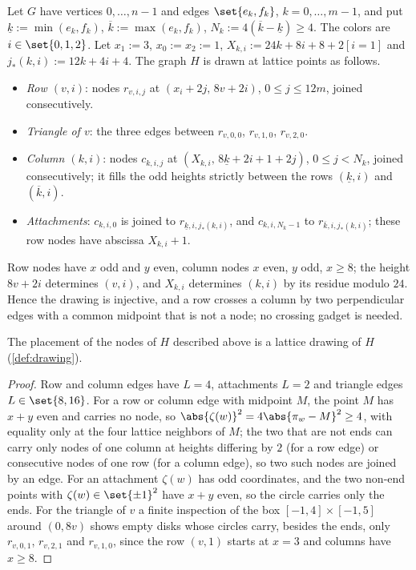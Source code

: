 Let $G$ have vertices $0,\dots,n-1$ and edges $\set{e_k,f_k}$, $k=0,\dots,m-1$, and put $\underline k:=\min(e_k,f_k)$, $\overline k:=\max(e_k,f_k)$, $N_k:=4(\overline k-\underline k)\ge4$. The colors are $i\in\set{0,1,2}$. Let $x_1:=3$, $x_0:=x_2:=1$, $X_{k,i}:=24k+8i+8+2[i=1]$ and $j_*(k,i):=12k+4i+4$. The graph $H$ is drawn at lattice points as follows.
\begin{itemize}
\item \emph{Row $(v,i)$}: nodes $r_{v,i,j}$ at $(x_i+2j,\,8v+2i)$, $0\le j\le12m$, joined consecutively.
\item \emph{Triangle of $v$}: the three edges between $r_{v,0,0}$, $r_{v,1,0}$, $r_{v,2,0}$.
\item \emph{Column $(k,i)$}: nodes $c_{k,i,j}$ at $(X_{k,i},\,8\underline k+2i+1+2j)$, $0\le j<N_k$, joined consecutively; it fills the odd heights strictly between the rows $(\underline k,i)$ and $(\overline k,i)$.
\item \emph{Attachments}: $c_{k,i,0}$ is joined to $r_{\underline k,i,j_*(k,i)}$, and $c_{k,i,N_k-1}$ to $r_{\overline k,i,j_*(k,i)}$; these row nodes have abscissa $X_{k,i}+1$.
\end{itemize}

Row nodes have $x$ odd and $y$ even, column nodes $x$ even, $y$ odd, $x\ge8$; the height $8v+2i$ determines $(v,i)$, and $X_{k,i}$ determines $(k,i)$ by its residue modulo $24$. Hence the drawing is injective, and a row crosses a column by two perpendicular edges with a common midpoint that is not a node; no crossing gadget is needed.

\begin{lemma}\label{lem:drawing}
The placement of the nodes of $H$ described above is a lattice drawing of $H$ (\cref{def:drawing}).
\end{lemma}

\begin{proof}
Row and column edges have $L=4$, attachments $L=2$ and triangle edges $L\in\set{8,16}$. For a row or column edge with midpoint $M$, the point $M$ has $x+y$ even and carries no node, so $\abs{\zeta(w)}^2=4\abs{\pi_w-M}^2\ge4$, with equality only at the four lattice neighbors of $M$; the two that are not ends can carry only nodes of one column at heights differing by $2$ (for a row edge) or consecutive nodes of one row (for a column edge), so two such nodes are joined by an edge. For an attachment $\zeta(w)$ has odd coordinates, and the two non-end points with $\zeta(w)\in\set{\pm1}^2$ have $x+y$ even, so the circle carries only the ends. For the triangle of $v$ a finite inspection of the box $[-1,4]\times[-1,5]$ around $(0,8v)$ shows empty disks whose circles carry, besides the ends, only $r_{v,0,1}$, $r_{v,2,1}$ and $r_{v,1,0}$, since the row $(v,1)$ starts at $x=3$ and columns have $x\ge8$.
\end{proof}

